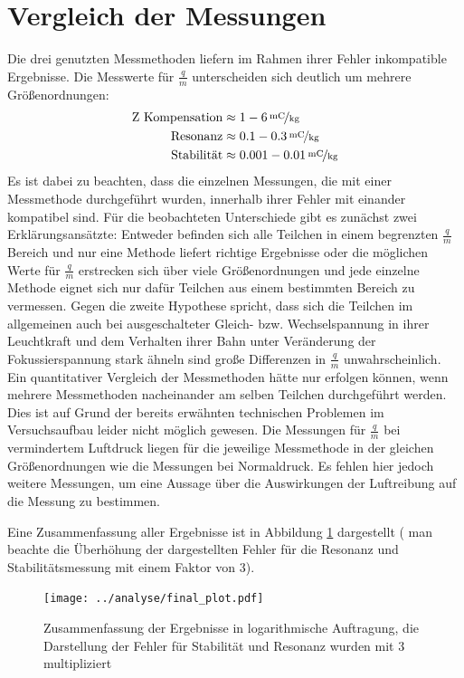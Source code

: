 \documentclass[a4paper,12pt]{article}
\begin{document}
\section{Vergleich der Messungen}
Die drei genutzten Messmethoden liefern im Rahmen ihrer Fehler inkompatible Ergebnisse. Die Messwerte für $\frac{q}{m}$ unterscheiden sich deutlich um mehrere Größenordnungen:
\begin{align*}
	\text{Z Kompensation}  & \approx \unitfrac[ 1 - 6  ]{mC}{kg}\\
	\text{Resonanz} & \approx \unitfrac[ 0.1 - 0.3 ]{mC}{kg}\\
	\text{Stabilität} &  \approx \unitfrac[ 0.001-0.01 ]{mC}{kg}\\ %
\end{align*}
Es ist dabei zu beachten, dass die einzelnen Messungen, die mit einer Messmethode durchgeführt wurden, innerhalb ihrer Fehler
mit einander kompatibel sind.
Für die beobachteten Unterschiede gibt es zunächst zwei Erklärungsansätzte:
Entweder befinden sich alle Teilchen in einem begrenzten $\frac{q}{m}$ Bereich und nur eine Methode liefert 
richtige Ergebnisse oder die möglichen Werte für $\frac{q}{m}$ erstrecken sich über viele Größenordnungen
und jede einzelne Methode eignet sich nur dafür Teilchen aus einem bestimmten Bereich zu vermessen.
Gegen die zweite Hypothese spricht, dass sich die Teilchen im allgemeinen auch bei ausgeschalteter Gleich- bzw. Wechselspannung in ihrer 
Leuchtkraft und dem Verhalten ihrer Bahn unter Veränderung der Fokussierspannung stark ähneln 
sind große Differenzen in $\frac{q}{m}$ unwahrscheinlich. Ein quantitativer Vergleich der Messmethoden hätte nur erfolgen können,
wenn mehrere Messmethoden nacheinander am selben Teilchen durchgeführt werden. Dies ist auf Grund der bereits erwähnten
technischen Problemen im Versuchsaufbau leider nicht möglich gewesen. Die Messungen für $\frac{q}{m}$ bei vermindertem Luftdruck liegen für die 
jeweilige Messmethode in der gleichen Größenordnungen wie die Messungen bei Normaldruck. Es fehlen hier jedoch weitere Messungen, um eine Aussage
über die Auswirkungen der Luftreibung auf die Messung zu bestimmen.

Eine Zusammenfassung aller Ergebnisse ist in Abbildung \ref{final_plot} dargestellt 
( man beachte die Überhöhung der dargestellten Fehler für die Resonanz und Stabilitätsmessung mit einem Faktor von 3).
\begin{figure}[htb]
		\centering
		\texttt{[image: ../analyse/final\_plot.pdf]}\\
		\caption{Zusammenfassung der Ergebnisse in logarithmische Auftragung, die Darstellung der Fehler für Stabilität und Resonanz wurden mit 3 multipliziert}
		\label{final_plot}
\end{figure}
\end{document}
